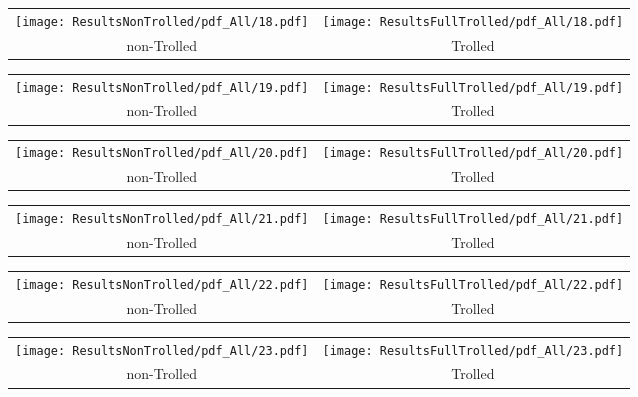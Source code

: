\begin{tabular}{cc}
{  \texttt{[image: ResultsNonTrolled/pdf\_All/18.pdf]} } & 
{  \texttt{[image: ResultsFullTrolled/pdf\_All/18.pdf]}} \\
 non-Trolled & Trolled \\
\end{tabular}

\begin{tabular}{cc}
{  \texttt{[image: ResultsNonTrolled/pdf\_All/19.pdf]} } & 
{  \texttt{[image: ResultsFullTrolled/pdf\_All/19.pdf]}} \\
 non-Trolled & Trolled \\
\end{tabular}

\begin{tabular}{cc}
{  \texttt{[image: ResultsNonTrolled/pdf\_All/20.pdf]} } & 
{  \texttt{[image: ResultsFullTrolled/pdf\_All/20.pdf]}} \\
 non-Trolled & Trolled \\
\end{tabular}

\begin{tabular}{cc}
{  \texttt{[image: ResultsNonTrolled/pdf\_All/21.pdf]} } & 
{  \texttt{[image: ResultsFullTrolled/pdf\_All/21.pdf]}} \\
 non-Trolled & Trolled \\
\end{tabular}

\begin{tabular}{cc}
{  \texttt{[image: ResultsNonTrolled/pdf\_All/22.pdf]} } & 
{  \texttt{[image: ResultsFullTrolled/pdf\_All/22.pdf]}} \\
 non-Trolled & Trolled \\
\end{tabular}

\begin{tabular}{cc}
{  \texttt{[image: ResultsNonTrolled/pdf\_All/23.pdf]} } & 
{  \texttt{[image: ResultsFullTrolled/pdf\_All/23.pdf]}} \\
 non-Trolled & Trolled \\
\end{tabular}

